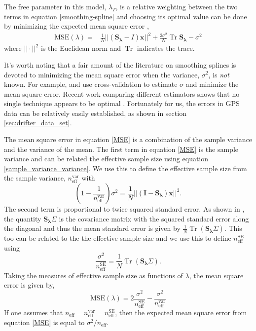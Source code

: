 \documentclass[10pt,journal]{IEEEtran}
\DeclareMathOperator{\Tr}{Tr}
\begin{document}
The free parameter in this model, $\lambda_T$, is a relative weighting between the two terms in equation \ref{smoothing-spline} and choosing its optimal value can be done by minimizing the expected mean square error \cite{craven1979-nm},
\begin{align}
\label{MSE}
    \textrm{MSE}(\lambda) =& \frac{1}{N} || \left( \mathbf{S_\lambda} - I \right) \mathbf{x} ||^2 + \frac{2 \sigma^2}{N}  \Tr \mathbf{S_\lambda} - \sigma^2
\end{align}
where $||\cdot||^2$ is the Euclidean norm and $\Tr$ indicates the trace.

It's worth noting that a fair amount of the literature on smoothing splines is devoted to minimizing the mean square error when the variance, $\sigma^2$, is \emph{not} known. For example, \cite{wahba1978-jrss-b} and \cite{craven1979-nm} use cross-validation to estimate $\sigma$ and minimize the mean square error. Recent work comparing different estimators shows that no single technique appears to be optimal \cite{lee2003-csda}. Fortunately for us, the errors in GPS data can be relatively easily established, as shown in section \ref{sec:drifter_data_set}.

The mean square error in equation \ref{MSE} is a combination of the sample variance and the variance of the mean. The first term in equation \ref{MSE} is the sample variance and can be related the effective sample size using equation \ref{sample_variance_variance}. We use this to define the effective sample size from the sample variance, $n_{\textrm{eff}}^{\textrm{var}}$ with
\begin{equation}
\label{dof_var}
    \left(1-\frac{1}{n_{\textrm{eff}}^{\textrm{var}}} \right)\sigma^2 = \frac{1}{N} || \left( \mathbf{I} - \mathbf{S_\lambda} \right) \mathbf{x} ||^2.
\end{equation}
The second term is proportional to twice squared standard error. As shown in \cite{teanby2007-mg}, the quantity $\mathbf{S_\lambda} \Sigma$ is the covariance matrix with the squared standard error along the diagonal and thus the mean standard error is given by $\frac{1}{N} \Tr \left( \mathbf{S_\lambda} \Sigma \right)$. This too can be related to the the effective sample size and we use this to define $n_{\textrm{eff}}^{\textrm{SE}}$ using
\begin{equation}
\label{dof_se}
    \frac{\sigma^2}{n_{\textrm{eff}}^{\textrm{SE}}} = \frac{1}{N} \Tr \left( \mathbf{S_\lambda} \Sigma \right).
\end{equation}
Taking the measures of effective sample size as functions of $\lambda$, the mean square error is given by,
\begin{equation}
    \textrm{MSE}(\lambda) = 2\frac{\sigma^2}{n_{\textrm{eff}}^{\textrm{SE}}} - \frac{\sigma^2}{n_{\textrm{eff}}^{\textrm{var}}}
\end{equation}
If one assumes that $n_{\textrm{eff}} = n_{\textrm{eff}}^{\textrm{var}} = n_{\textrm{eff}}^{\textrm{SE}}$, then the expected mean square error from equation \ref{MSE} is equal to $\sigma^2/n_{\textrm{eff}}$.
\end{document}
